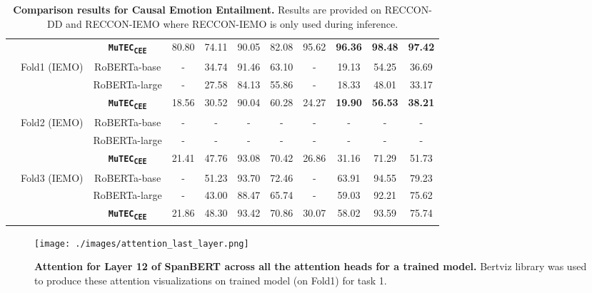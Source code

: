 \documentclass{article}
\newcommand{\subtwo}{\textbf{\texttt{MuTEC\textsubscript{CEE}}}}
\begin{document}
{\begin{table*}[t]
{\begin{tabular}{|c|c|c|c|c|c|c|c|c|c|c|}
                             &                               & \subtwo          & 80.80 & 74.11 & 90.05 & 82.08 & 95.62 & \textbf{96.36} & \textbf{98.48} & \textbf{97.42} \\ \cline{2-11} 
                             & \multirow{3}{*}{Fold1 (IEMO)} & RoBERTa-base  & -     & 34.74 & 91.46 & 63.10 & -     & 19.13 & 54.25 & 36.69 \\ \cline{3-11} 
                             &                               & RoBERTa-large & -     & 27.58 & 84.13 & 55.86 & -     & 18.33 & 48.01 & 33.17 \\ \cline{3-11} 
                             &                               & \subtwo          & 18.56 & 30.52 & 90.04 & 60.28 & 24.27 & \textbf{19.90} & \textbf{56.53} & \textbf{38.21} \\ \cline{2-11} 
                             & \multirow{3}{*}{Fold2 (IEMO)} & RoBERTa-base  & -     & -     & -     & -     & -     & -     & -     & -     \\ \cline{3-11} 
                             &                               & RoBERTa-large & -     & -     & -     & -     & -     & -     & -     & -     \\ \cline{3-11} 
                             &                               & \subtwo          & 21.41 & 47.76 & 93.08 & 70.42 & 26.86 & 31.16 & 71.29 & 51.73 \\ \cline{2-11} 
                             & \multirow{3}{*}{Fold3 (IEMO)} & RoBERTa-base  & -     & 51.23 & 93.70 & 72.46 & -     & 63.91 & 94.55 & 79.23 \\ \cline{3-11} 
                             &                               & RoBERTa-large & -     & 43.00 & 88.47 & 65.74 & -     & 59.03 & 92.21 & 75.62 \\ \cline{3-11} 
                             &                               & \subtwo          &  21.86     &  48.30     &     93.42  &  70.86     & 30.07 & 58.02 & 93.59 & 75.74 \\ \hline
 \end{tabular}
}
\vspace{1mm}
\caption{\textbf{Comparison results for Causal Emotion Entailment.} Results are provided on RECCON-DD and RECCON-IEMO where RECCON-IEMO is only used during inference.}
\label{app-tab:sub2}
\end{table*}
}



\begin{figure*}[!h]
\centering
  \texttt{[image: ./images/attention\_last\_layer.png]}
  \caption{\textbf{Attention for Layer 12 of SpanBERT across all the attention heads for a trained model.} Bertviz \cite{vig-2019-multiscale} library was used to produce these attention visualizations on trained model (on Fold1) for task 1.}
  \label{app-fig:attention_model_view}
\end{figure*}
\end{document}
